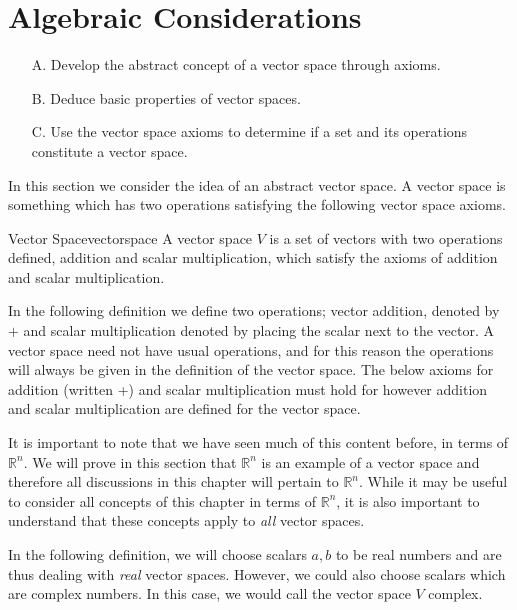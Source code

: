 \section{Algebraic Considerations}

\begin{outcome}
\begin{enumerate}
\item[A.] Develop the abstract concept of a vector space through axioms.

\item[B.] Deduce basic properties of vector spaces.

\item[C.]  Use the vector space axioms to determine if a set and its operations constitute a vector space.
\end{enumerate}
\end{outcome}

In this section we consider the idea of an abstract vector space. A vector space is
something which has two operations satisfying the following vector space
axioms.

\begin{definition}{Vector Space}{vectorspace}
A vector space $V$ is a set of vectors with two operations defined, addition and scalar multiplication, which satisfy the axioms of addition and scalar multiplication. 
\end{definition}

In the following definition we define two operations; vector addition, denoted by $+$ and scalar
multiplication denoted by placing the scalar next to the vector. A vector space need not have usual operations, and for this reason the operations will always be given in the definition of the vector space. The below axioms for addition (written +) and scalar multiplication must hold for however addition and scalar multiplication are defined for the vector space.  

It is important to note that we have seen much of this content before, in terms of $\mathbb{R}^n$. We will prove in this section that $\mathbb{R}^n$ is an example of a vector space and therefore all discussions in this chapter will pertain to $\mathbb{R}^n$. While it may be useful to consider all concepts of this chapter in terms of $\mathbb{R}^n$, it is also important to understand that these concepts apply to \textit{all} vector spaces. 

In the following definition, we will choose scalars $a,b$ to be real numbers and are thus dealing with \textit{real} vector spaces. However, we could also choose scalars which are complex numbers. In this case, we would call the vector space $V$ complex. 

